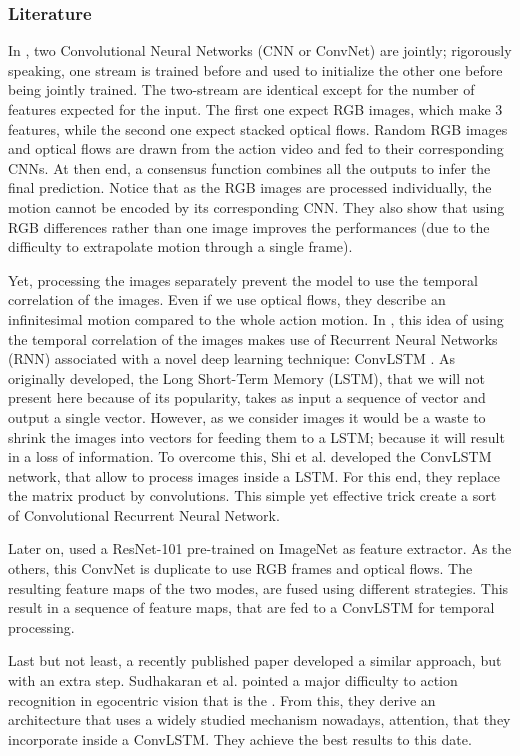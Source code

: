 \documentclass[12pt, a4paper]{report}
\begin{document}
				\subsubsection{Literature}
					In \cite{wang}, two Convolutional Neural Networks (CNN or ConvNet) are \gls{jointly}; rigorously speaking, one stream is trained before and used to initialize the other one before being jointly trained.
					The two-stream are identical except for the number of features expected for the input.
					The first one expect RGB images, which make 3 features, while the second one expect stacked optical flows.
					Random RGB images and optical flows are drawn from the action video and fed to their corresponding CNNs.
					At then end, a consensus function combines all the outputs to infer the final prediction.
					Notice that as the RGB images are processed individually, the motion cannot be encoded by its corresponding CNN.
					They also show that using RGB differences rather than one image improves the performances (due to the difficulty to extrapolate motion through a single frame).\par
					Yet, processing the images separately prevent the model to use the temporal correlation of the images.
					Even if we use optical flows, they describe an infinitesimal motion compared to the whole action motion.
					In \cite{ye}, this idea of using the temporal correlation of the images makes use of Recurrent Neural Networks (RNN) associated with a novel deep learning technique: ConvLSTM \cite{shi}.
					As originally developed, the Long Short-Term Memory (LSTM), that we will not present here because of its popularity, takes as input a sequence of vector and output a single vector.
					However, as we consider images it would be a waste to shrink the images into vectors for feeding them to a LSTM; because it will result in a loss of information.
					To overcome this, Shi et al. \cite{shi} developed the ConvLSTM network, that allow to process images inside a LSTM.
					For this end, they replace the matrix product by convolutions.
					This simple yet effective trick create a sort of Convolutional Recurrent Neural Network.\par
					Later on, \cite{ye} used a ResNet-101 pre-trained on ImageNet as feature extractor.
					As the others, this ConvNet is duplicate to use RGB frames and optical flows.
					The resulting feature maps of the two modes, are fused using different strategies.
					This result in a sequence of feature maps, that are fed to a ConvLSTM for temporal processing.\par
					Last but not least, a recently published paper developed a similar approach, but with an extra step.
					Sudhakaran et al. \cite{sudhakaran} pointed a major difficulty to action recognition in egocentric vision that is the .
					From this, they derive an architecture that uses a widely studied mechanism nowadays, attention, that they incorporate inside a ConvLSTM.  %
					They achieve the best results to this date.\par
\end{document}
